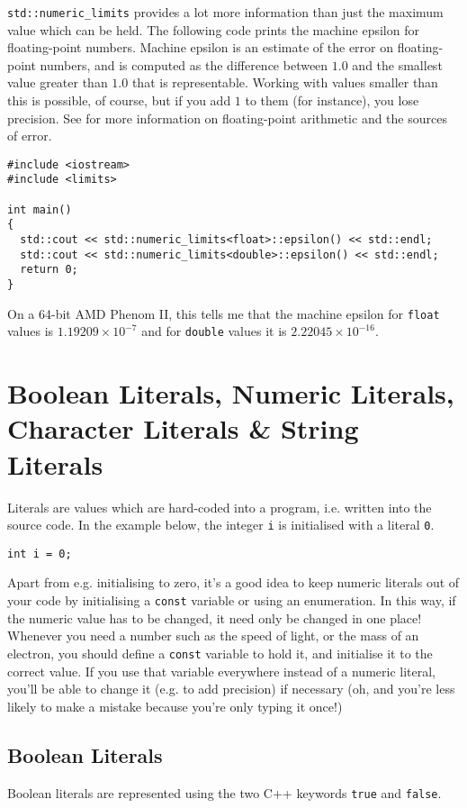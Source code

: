 \documentclass[a4paper]{scrartcl}
\begin{document}
\texttt{std::numeric\_limits} provides a lot more information than just the maximum value which can be held. The following code prints the machine epsilon for floating-point numbers. Machine epsilon is an estimate of the error on floating-point numbers, and is computed as the difference between $1.0$ and the smallest value greater than $1.0$ that is representable. Working with values smaller than this is possible, of course, but if you add $1$ to them (for instance), you lose precision. See \cite{Goldberg1991} for more information on floating-point arithmetic and the sources of error.
\begin{verbatim}
#include <iostream>
#include <limits>

int main()
{
  std::cout << std::numeric_limits<float>::epsilon() << std::endl;
  std::cout << std::numeric_limits<double>::epsilon() << std::endl;
  return 0;
}
\end{verbatim}
On a 64-bit AMD Phenom II, this tells me that the machine epsilon for \texttt{float} values is $1.19209\times 10^{-7}$ and for \texttt{double} values it is $2.22045\times 10^{-16}$.

\section{Boolean Literals, Numeric Literals, Character Literals \& String Literals}
Literals are values which are hard-coded into a program, i.e. written into the source code. In the example below, the integer \texttt{i} is initialised with a literal \texttt{0}.
\begin{verbatim}
int i = 0;
\end{verbatim}

Apart from e.g. initialising to zero, it's a good idea to keep numeric literals out of your code by initialising a \texttt{const} variable or using an enumeration. In this way, if the numeric value has to be changed, it need only be changed in one place! Whenever you need a number such as the speed of light, or the mass of an electron, you should define a \texttt{const} variable to hold it, and initialise it to the correct value. If you use that variable everywhere instead of a numeric literal, you'll be able to change it (e.g. to add precision) if necessary (oh, and you're less likely to make a mistake because you're only typing it once!)

\subsection{Boolean Literals}
Boolean literals are represented using the two C++ keywords \texttt{true} and \texttt{false}.
\end{document}
